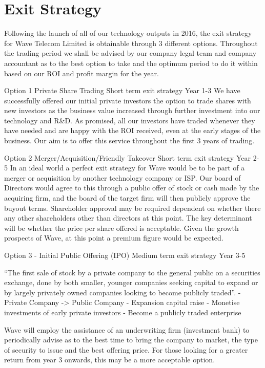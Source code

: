 \documentclass[letterpaper,10pt,openany,oneside,english]{sphinxmanual}
\begin{document}
\section{Exit Strategy}
\label{\detokenize{executive-statement:exit-strategy}}
Following the launch of all of our technology outputs in 2016, the exit strategy for Wave
Telecom Limited is obtainable through 3 different options. Throughout the trading period we
shall be advised by our company legal team and company accountant as to the best option to
take and the optimum period to do it within based on our ROI and profit margin for the year.

Option 1 \textendash{} Private Share Trading
Short term exit strategy Year 1-3
We have successfully offered our initial private investors the option to trade shares with new
investors as the business value increased through further investment into our technology and
R\&D. As promised, all our investors have traded whenever they have needed and are happy
with the ROI received, even at the early stages of the business. Our aim is to offer this service
throughout the first 3 years of trading.

Option 2 \textendash{} Merger/Acquisition/Friendly Takeover
Short term exit strategy Year 2-5
In an ideal world a perfect exit strategy for Wave would be to be part of a merger or acquisition
by another technology company or ISP. Our board of Directors would agree to this through a
public offer of stock or cash made by the acquiring firm, and the board of the target firm will
then publicly approve the buyout terms. Shareholder approval may be required dependent on
whether there any other shareholders other than directors at this point. The key determinant will
be whether the price per share offered is acceptable. Given the growth prospects of Wave, at
this point a premium figure would be expected.

Option 3 - Initial Public Offering (IPO)
Medium term exit strategy Year 3-5

“The first sale of stock by a private company to the general public on a securities exchange,
done by both smaller, younger companies seeking capital to expand or by largely privately
owned companies looking to become publicly traded”.
- Private Company -\textgreater{} Public Company
- Expansion capital raise
- Monetise investments of early private investors
- Become a publicly traded enterprise

Wave will employ the assistance of an underwriting firm (investment bank) to periodically advise
as to the best time to bring the company to market, the type of security to issue and the best
offering price. For those looking for a greater return from year 3 onwards, this may be a more
acceptable option.
\end{document}

